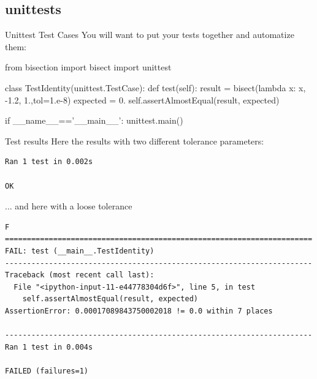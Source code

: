 \documentclass[hyperref={pdfpagelabels=false},table, handout]{beamer}
\begin{document}
\subsection{unittests}
\begin{frame}[fragile]{Unittest Test Cases}
You will want to \alert{put your tests together} and automatize them:
\begin{python}
from bisection import bisect
import unittest

class TestIdentity(unittest.TestCase):
    def test(self):
        result = bisect(lambda x: x, -1.2, 1.,tol=1.e-8)
        expected = 0.
        self.assertAlmostEqual(result, expected)

if __name__=='__main__':
    unittest.main()
\end{python}
\end{frame}

\begin{frame}[fragile]{Test results}
Here the results with two different tolerance parameters:

\tiny
\begin{lstlisting}
Ran 1 test in 0.002s

OK
\end{lstlisting}
\normalsize

... and here with a loose tolerance
\tiny
\begin{lstlisting}
F
======================================================================
FAIL: test (__main__.TestIdentity)
----------------------------------------------------------------------
Traceback (most recent call last):
  File "<ipython-input-11-e44778304d6f>", line 5, in test
    self.assertAlmostEqual(result, expected)
AssertionError: 0.00017089843750002018 != 0.0 within 7 places

----------------------------------------------------------------------
Ran 1 test in 0.004s

FAILED (failures=1)

\end{lstlisting}
\normalsize
\end{frame}
\end{document}
